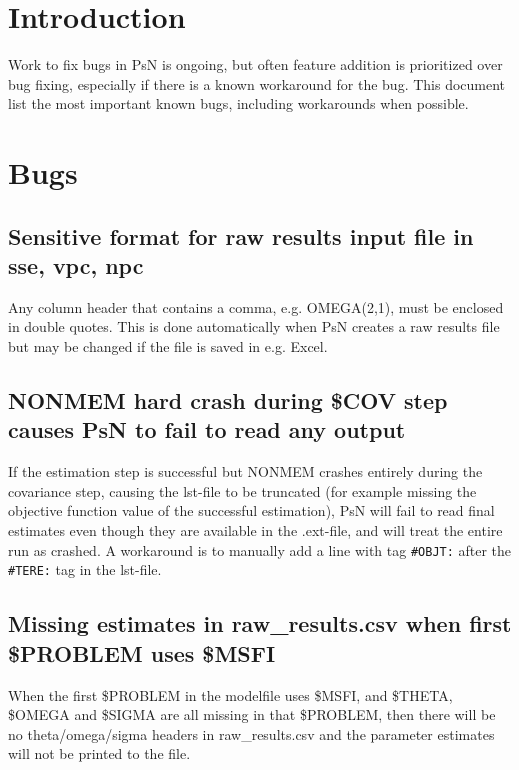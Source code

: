 



\maketitle


\section{Introduction}
Work to fix bugs in PsN is ongoing, but often feature addition is prioritized over bug fixing, especially if there is a known workaround for the bug. This document list the most important known bugs, including workarounds when possible.   

\section{Bugs}

\subsection{Sensitive format for raw results input file in sse, vpc, npc}
Any column header that contains a comma, e.g. OMEGA(2,1), must be enclosed in double quotes. This is done automatically when PsN creates a raw results file but may be changed if the file is saved in e.g. Excel.

\subsection{NONMEM hard crash during \$COV step causes PsN to fail to read any output}
If the estimation step is successful but NONMEM crashes entirely during the covariance step, causing the
lst-file to be truncated (for example missing the objective function value of the successful estimation),
PsN will fail to read final estimates even though they are available in the .ext-file, 
and will treat the entire run as crashed. A workaround is to manually add a line with tag \verb|#OBJT:| after the 
\verb|#TERE:| tag in the lst-file.

\subsection{Missing estimates in raw\_results.csv when first \$PROBLEM uses \$MSFI}
When the first \$PROBLEM in the modelfile uses \$MSFI, and \$THETA, \$OMEGA and \$SIGMA are all missing in that \$PROBLEM, then there will be no theta/omega/sigma headers in raw\_results.csv and the parameter estimates will not be printed to the file.

